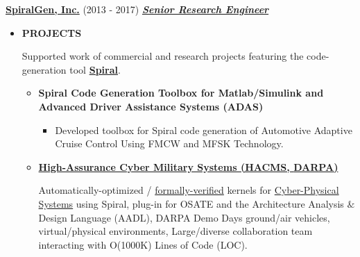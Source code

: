 \documentclass{article}
\newcommand{\employer}[3]{{ \textbf{#1} (#2) \underline{\textbf{\emph{#3}}}\\  }}
\begin{document}
    

\employer{\href{http://spiralgen.com/}{SpiralGen, Inc.}}{2013 - 2017}{Senior Research Engineer}


\vspace{1mm}

    \begin{itemize}

      \item \textbf{PROJECTS}

      Supported work of commercial and research projects featuring the code-generation tool \textbf{\href{http://spiral.net/}{Spiral}}.

      \begin{itemize}

        \item \textbf{Spiral Code Generation Toolbox for Matlab/Simulink and Advanced Driver Assistance Systems (ADAS)}
        \begin{itemize} 
        \item Developed toolbox for Spiral code generation of Automotive Adaptive Cruise Control Using FMCW and MFSK Technology.
        \end{itemize}

        \item \textbf{\href{http://www.darpa.mil/Our_Work/I2O/Programs/High-Assurance_Cyber_Military_Systems_(HACMS).aspx}{High-Assurance Cyber Military Systems (HACMS, \href{http://www.darpa.mil/default.aspx}{DARPA})}} 
        \begin{itemize}
        Automatically-optimized / \href{https://en.wikipedia.org/wiki/Formal_methods}{formally-verified} kernels for \href{https://en.wikipedia.org/wiki/Cyber-physical_system}{Cyber-Physical Systems} using Spiral, plug-in for OSATE and the Architecture Analysis $\&$ Design Language (AADL), DARPA Demo Days ground/air vehicles, virtual/physical environments, Large/diverse collaboration team interacting with O(1000K) Lines of Code (LOC). 
        \end{itemize}
        

\end{itemize}
\end{itemize}
\end{document}
